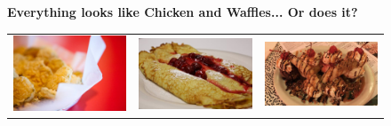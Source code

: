 \documentclass[letterpaper, 10 pt, conference]{ieeeconf}
\begin{document}
\begin{figure}
\begin{center}
\textbf{Everything looks like Chicken and Waffles... Or does it?}\par\medskip
\begin{tabular}{lll}
 \includegraphics[scale = .23]{c3}& \includegraphics[scale = .23]{c2} &  \includegraphics[scale = .23]{c1}\\

\end{tabular}
\end{center}
\end{figure}
\end{document}

